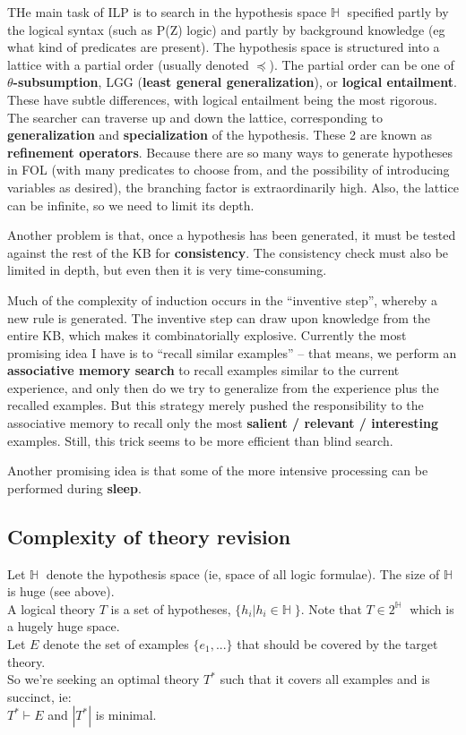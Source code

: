 \documentclass[a4paper]{report}
\begin{document}
THe main task of ILP is to search in the hypothesis space $\mathbb{H} \;$ specified partly by the logical syntax (such as P(Z) logic) and partly by background knowledge (eg what kind of predicates are present).  The hypothesis space is structured into a lattice with a partial order (usually denoted $ \preceq $).  The partial order can be one of \textbf{$\theta$-subsumption}, LGG (\textbf{least general generalization}), or \textbf{logical entailment}.  These have subtle differences, with logical entailment being the most rigorous.  The searcher can traverse up and down the lattice, corresponding to \textbf{generalization} and \textbf{specialization} of the hypothesis.  These 2 are known as \textbf{refinement operators}.  Because there are so many ways to generate hypotheses in FOL (with many predicates to choose from, and the possibility of introducing variables as desired), the branching factor is extraordinarily high.  Also, the lattice can be infinite, so we need to limit its depth.

Another problem is that, once a hypothesis has been generated, it must be tested against the rest of the KB for \textbf{consistency}.  The consistency check must also be limited in depth, but even then it is very time-consuming.

Much of the complexity of induction occurs in the ``inventive step'', whereby a new rule is generated.  The inventive step can draw upon knowledge from the entire KB, which makes it combinatorially explosive.  Currently the most promising idea I have is to ``recall similar examples'' -- that means, we perform an \textbf{associative memory search} to recall examples similar to the current experience, and only then do we try to generalize from the experience plus the recalled examples.  But this strategy merely pushed the responsibility to the associative memory to recall only the most \textbf{salient / relevant / interesting} examples.  Still, this trick seems to be more efficient than blind search.

Another promising idea is that some of the more intensive processing can be performed during \textbf{sleep}.

\subsection{Complexity of theory revision}

Let $\mathbb{H} \;$  denote the hypothesis space (ie, space of all logic formulae).  The size of $\mathbb{H} \;$ is huge (see above).\\
A logical theory $T$ is a set of hypotheses, $ \{ h_i | h_i \in \mathbb{H} \; \} $.  Note that $ T \in 2^{\mathbb{H}} \;$ which is a hugely huge space.\\
Let $E$ denote the set of examples $\{ e_1, ... \}$ that should be covered by the target theory.\\
So we're seeking an optimal theory $T^*$ such that it covers all examples and is succinct, ie:\\
\hspace*{1cm} $ T^* \vdash E $ \quad and \quad $ |T^*| $ is minimal.
\end{document}
